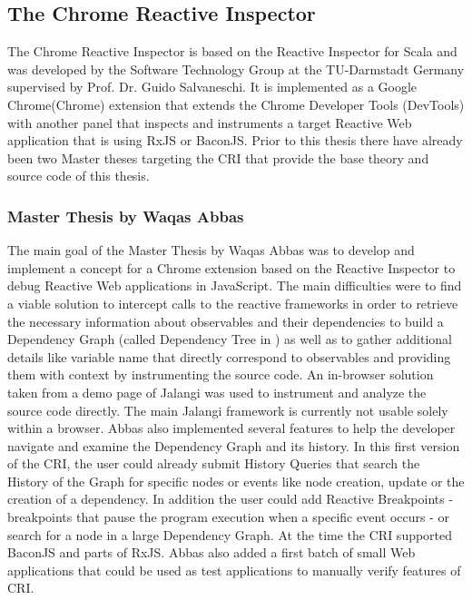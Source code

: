 	\subsection{The Chrome Reactive Inspector}
	\label{sec:PreviousCRI}
	The Chrome Reactive Inspector is based on the Reactive Inspector for Scala \cite{ReactiveInspector} and was developed by the Software Technology Group at the TU-Darmstadt Germany supervised by Prof. Dr. Guido Salvaneschi. It is implemented as a Google Chrome(Chrome) extension that extends the Chrome Developer Tools (DevTools) with another panel that inspects and instruments a target Reactive Web application that is using RxJS or BaconJS. Prior to this thesis there have already been two Master theses targeting the CRI that provide the base theory and source code of this thesis.
	\subsubsection{Master Thesis by Waqas Abbas}
	\cite{ThesisAbbas} The main goal of the Master Thesis by Waqas Abbas was to develop and implement a concept for a Chrome extension based on the Reactive Inspector to debug Reactive Web applications in JavaScript.
	The main difficulties were to find a viable solution to intercept calls to the reactive frameworks in order to retrieve the necessary information about observables and their dependencies to build a Dependency Graph (called Dependency Tree in \cite{ReactiveInspector}) as well as to gather additional details like variable name that directly correspond to observables and providing them with context by instrumenting the source code. An in-browser solution taken from a demo page \cite{JalangiDemo} of Jalangi was used to instrument and analyze the source code directly. The main Jalangi framework \cite{Jalangi} is currently not usable solely within a browser.
	Abbas also implemented several features to help the developer navigate and examine the Dependency Graph and its history. In this first version of the CRI, the user could already submit History Queries that search the History of the Graph for specific nodes or events like node creation, update or the creation of a dependency. In addition the user could add Reactive Breakpoints - breakpoints that pause the program execution when a specific event occurs - or search for a node in a large Dependency Graph.
	At the time the CRI supported BaconJS\cite{BaconJS} and parts of RxJS\cite{RxJS}. Abbas also added a first batch of small Web applications that could be used as test applications to manually verify features of CRI.
		
